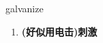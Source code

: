 
\begin{frame}
{\huge galvanize}
\begin{center}
\begin{enumerate}\Large
  \item \textbf{(好似用电击)刺激}
\end{enumerate}
\end{center}
\end{frame}
